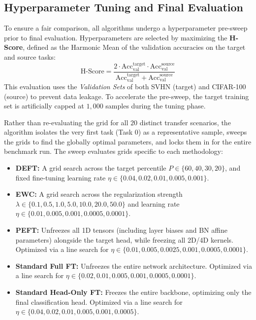 \documentclass[11pt, a4paper, copyright, gdm]{google}
\theoremstyle{definition}
\begin{document}
\subsection{Hyperparameter Tuning and Final Evaluation}
To ensure a fair comparison, all algorithms undergo a hyperparameter pre-sweep prior to final evaluation. Hyperparameters are selected by maximizing the \textbf{H-Score}, defined as the Harmonic Mean of the validation accuracies on the target and source tasks:
\begin{equation}
    \text{H-Score} = \frac{2 \cdot \text{Acc}_{\text{val}}^{\text{target}} \cdot \text{Acc}_{\text{val}}^{\text{source}}}{\text{Acc}_{\text{val}}^{\text{target}} + \text{Acc}_{\text{val}}^{\text{source}}}
\end{equation}
This evaluation uses the \textit{Validation Sets} of both SVHN (target) and CIFAR-100 (source) to prevent data leakage. To accelerate the pre-sweep, the target training set is artificially capped at $1,000$ samples during the tuning phase. 

Rather than re-evaluating the grid for all $20$ distinct transfer scenarios, the algorithm isolates the very first task (Task 0) as a representative sample, sweeps the grids to find the globally optimal parameters, and locks them in for the entire benchmark run. The sweep evaluates grids specific to each methodology:
\begin{itemize}
    \item \textbf{DEFT:} A grid search across the target percentile $P \in \{60, 40, 30, 20\}$, and fixed fine-tuning learning rate $\eta \in \{0.04, 0.02, 0.01, 0.005, 0.001\}$.
    \item \textbf{EWC:} A grid search across the regularization strength $\lambda \in \{0.1, 0.5, 1.0, 5.0, 10.0, 20.0, 50.0\}$ and learning rate $\eta \in \{0.01, 0.005, 0.001, 0.0005, 0.0001\}$.
    \item \textbf{PEFT:} Unfreezes all 1D tensors (including layer biases and BN affine parameters) alongside the target head, while freezing all 2D/4D kernels. Optimized via a line search for $\eta \in \{0.01, 0.005, 0.0025, 0.001, 0.0005, 0.0001\}$.
    \item \textbf{Standard Full FT:} Unfreezes the entire network architecture. Optimized via a line search for $\eta \in \{0.02, 0.01, 0.005, 0.001, 0.0005, 0.0001\}$.
    \item \textbf{Standard Head-Only FT:} Freezes the entire backbone, optimizing only the final classification head. Optimized via a line search for $\eta \in \{0.04, 0.02, 0.01, 0.005, 0.001, 0.0005\}$.
\end{itemize}
\end{document}
